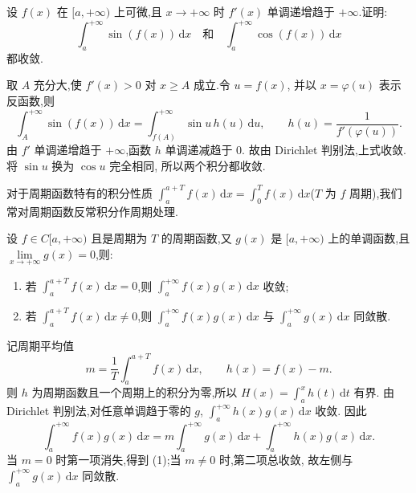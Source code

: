 \begin{example}
  设 $f(x)$ 在 $\lbrack a,+\infty)$ 上可微,且 $x\to+\infty$ 时 $f'(x)$ 单调递增趋于 $+\infty$.证明:
  \[
    \displaystyle\int_a^{+\infty}\sin(f(x))\,\mathrm{d}x
    \quad\text{和}\quad
    \int_a^{+\infty}\cos(f(x))\,\mathrm{d}x
  \]
  都收敛.
\end{example}
\exampleblank

\begin{solution}
  取 $A$ 充分大,使 $f'(x)>0$ 对 $x\geq A$ 成立.令 $u=f(x)$,
  并以 $x=\varphi(u)$ 表示反函数,则
  \[
    \displaystyle\int_A^{+\infty}\sin(f(x))\,\mathrm{d}x
    =\int_{f(A)}^{+\infty}\sin u\,h(u)\,\mathrm{d}u,
    \qquad
    h(u)=\dfrac{1}{f'(\varphi(u))}.
  \]
  由 $f'$ 单调递增趋于 $+\infty$,函数 $h$ 单调递减趋于 $0$.
  故由 Dirichlet 判别法,上式收敛.将 $\sin u$ 换为 $\cos u$ 完全相同,
  所以两个积分都收敛.
\end{solution}

对于周期函数特有的积分性质 $\displaystyle\int_a^{a+T}f(x)\,\mathrm{d}x=\int_0^Tf(x)\,\mathrm{d}x$($T$ 为 $f$ 周期),我们常对周期函数反常积分作周期处理.

\begin{example}
  设 $f\in C\lbrack a,+\infty)$ 且是周期为 $T$ 的周期函数,又 $g(x)$ 是 $\lbrack a,+\infty)$ 上的单调函数,且 $\displaystyle\lim\limits_{x\to+\infty}g(x)=0$,则:
  \begin{enumerate}
    \item 若 $\displaystyle\int_a^{a+T}f(x)\,\mathrm{d}x=0$,则 $\displaystyle\int_a^{+\infty}f(x)g(x)\,\mathrm{d}x$ 收敛;
    \item 若 $\displaystyle\int_a^{a+T}f(x)\,\mathrm{d}x\neq0$,则 $\displaystyle\int_a^{+\infty}f(x)g(x)\,\mathrm{d}x$ 与 $\displaystyle\int_a^{+\infty}g(x)\,\mathrm{d}x$ 同敛散.
  \end{enumerate}
\end{example}
\exampleblank

\begin{solution}
  记周期平均值
  \[
    m=\dfrac{1}{T}\int_a^{a+T}f(x)\,\mathrm{d}x,
    \qquad
    h(x)=f(x)-m.
  \]
  则 $h$ 为周期函数且一个周期上的积分为零,所以
  $\displaystyle H(x)=\int_a^xh(t)\,\mathrm{d}t$ 有界.
  由 Dirichlet 判别法,对任意单调趋于零的 $g$,
  $\displaystyle\int_a^{+\infty}h(x)g(x)\,\mathrm{d}x$ 收敛.
  因此
  \[
    \displaystyle\int_a^{+\infty}f(x)g(x)\,\mathrm{d}x
    =m\int_a^{+\infty}g(x)\,\mathrm{d}x
    +\int_a^{+\infty}h(x)g(x)\,\mathrm{d}x.
  \]
  当 $m=0$ 时第一项消失,得到 (1);当 $m\neq0$ 时,第二项总收敛,
  故左侧与 $\displaystyle\int_a^{+\infty}g(x)\,\mathrm{d}x$ 同敛散.
\end{solution}

